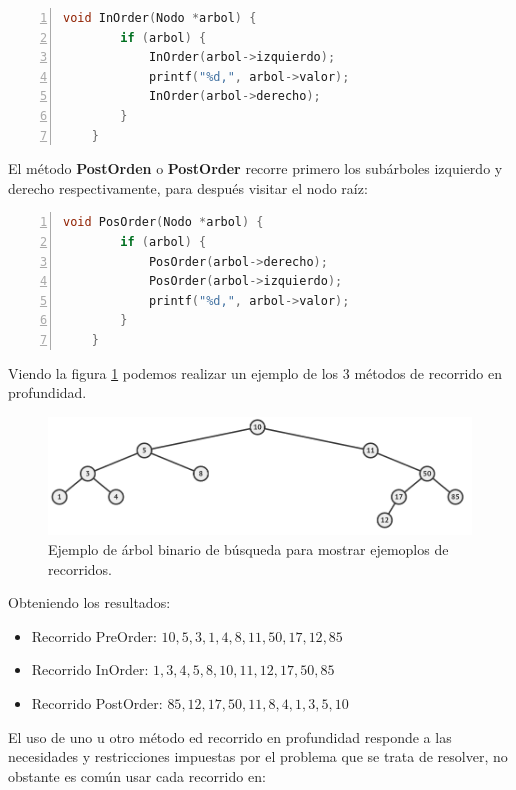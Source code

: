 \documentclass[a4paper, 11pt, titlepage]{article}
\begin{document}
            \begin{lstlisting}[language=C,numbers=left]
    void InOrder(Nodo *arbol) {
        if (arbol) {
            InOrder(arbol->izquierdo);
            printf("%d,", arbol->valor);
            InOrder(arbol->derecho);
        }
    }\end{lstlisting}

            El método \textbf{PostOrden} o \textbf{PostOrder} recorre primero los subárboles izquierdo 
            y derecho respectivamente, para después visitar el nodo raíz:

            \begin{lstlisting}[language=C,numbers=left]
    void PosOrder(Nodo *arbol) {
        if (arbol) {
            PosOrder(arbol->derecho);
            PosOrder(arbol->izquierdo);
            printf("%d,", arbol->valor);
        }
    }\end{lstlisting}
            
            Viendo la figura \ref{arbol03} podemos realizar un ejemplo de los 3 métodos de recorrido en profundidad.

            \begin{figure}[htp]
                \centering
                \includegraphics[width=1\textwidth]{resources/arbol03.png}
                \caption{Ejemplo de árbol binario de búsqueda para mostrar ejemoplos de recorridos.}
                \label{arbol03}
            \end{figure}

            Obteniendo los resultados: 

            \begin{itemize}
                \item Recorrido PreOrder: $10,5,3,1,4,8,11,50,17,12,85$
                \item Recorrido InOrder: $1,3,4,5,8,10,11,12,17,50,85$
                \item Recorrido PostOrder: $85,12,17,50,11,8,4,1,3,5,10$
            \end{itemize}

            El uso de uno u otro método ed recorrido en profundidad responde a las necesidades y 
            restricciones impuestas por el problema que se trata de resolver, no obstante es común usar
            cada recorrido en:
\end{document}
